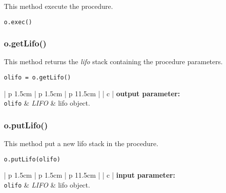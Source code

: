 This method execute the procedure.

\begin{verbatim}
o.exec()
\end{verbatim}

\vskip 0.8cm

\subsubsection{o.getLifo()}

This method returns the {\sl lifo} stack containing the procedure parameters.

\begin{verbatim}
olifo = o.getLifo()
\end{verbatim}

\noindent
\begin{tabular} {| p {1.5cm} | p {1.5cm} | p {11.5cm} |}
\hline
{} {| c |} {\bf output parameter:} \\
\hline
{\tt olifo} & {\it LIFO}  & {\sc lifo} object. \\
\hline
\end{tabular}

\vskip 0.8cm

\subsubsection{o.putLifo()}

This method put a new {\sc lifo} stack in the procedure.

\begin{verbatim}
o.putLifo(olifo)
\end{verbatim}

\noindent
\begin{tabular} {| p {1.5cm} | p {1.5cm} | p {11.5cm} |}
\hline
{} {| c |} {\bf input parameter:} \\
\hline
{\tt olifo} & {\it LIFO}  & {\sc lifo} object. \\
\hline
\end{tabular}
